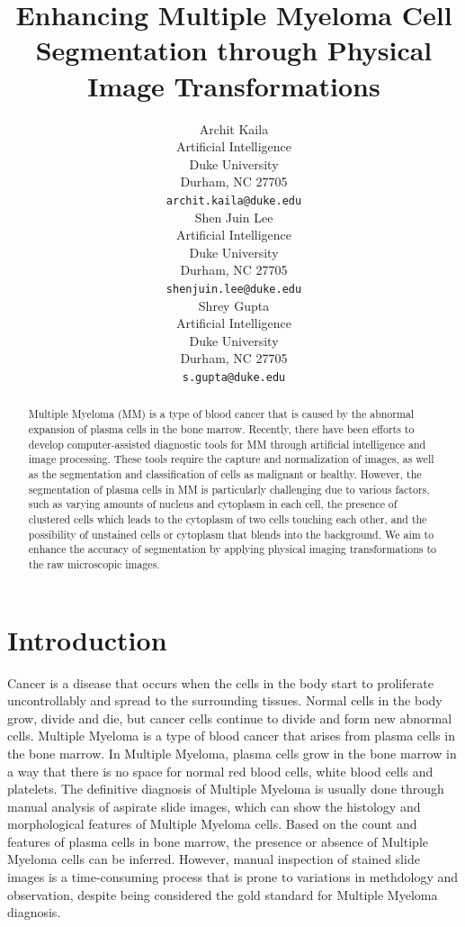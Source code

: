 \documentclass{article}
\title{Enhancing Multiple Myeloma Cell Segmentation through Physical Image Transformations}
\author{%
  Archit Kaila\\
  Artificial Intelligence\\
  Duke University\\
  Durham, NC 27705\\
  \texttt{archit.kaila@duke.edu} \\
  \And
  Shen Juin Lee \\
  Artificial Intelligence\\
  Duke University\\
  Durham, NC 27705\\
  \texttt{shenjuin.lee@duke.edu} \\
  \And
  Shrey Gupta\\
  Artificial Intelligence\\
  Duke University\\
  Durham, NC 27705\\
  \texttt{s.gupta@duke.edu} \\
}
\begin{document}

\maketitle

\begin{abstract}
Multiple Myeloma (MM) is a type of blood cancer that is caused by the abnormal expansion of plasma cells in the bone marrow. Recently, there have been efforts to develop computer-assisted diagnostic tools for MM through artificial intelligence and image processing. These tools require the capture and normalization of images, as well as the segmentation and classification of cells as malignant or healthy. However, the segmentation of plasma cells in MM is particularly challenging due to various factors, such as varying amounts of nucleus and cytoplasm in each cell, the presence of clustered cells which leads to the cytoplasm of two cells touching each other, and the possibility of unstained cells or cytoplasm that blends into the background. We aim to enhance the accuracy of segmentation by applying physical imaging transformations to the raw microscopic images.
\end{abstract}

\section{Introduction}

Cancer is a disease that occurs when the cells in the body start to proliferate uncontrollably and spread to the surrounding tissues. Normal cells in the body grow, divide and die, but cancer cells continue to divide and form new abnormal cells. Multiple Myeloma is a type of blood cancer that arises from plasma cells in the bone marrow. In Multiple Myeloma, plasma cells grow in the bone marrow in a way that there is no space for normal red blood cells, white blood cells and platelets. The definitive diagnosis of Multiple Myeloma is usually done through manual analysis of aspirate slide images, which can show the histology and morphological features of Multiple Myeloma cells. Based on the count and features of plasma cells in bone marrow, the presence or absence of Multiple Myeloma cells can be inferred. However, manual inspection of stained slide images is a time-consuming process that is prone to variations in methdology and observation, despite being considered the gold standard for Multiple Myeloma diagnosis.
\end{document}
